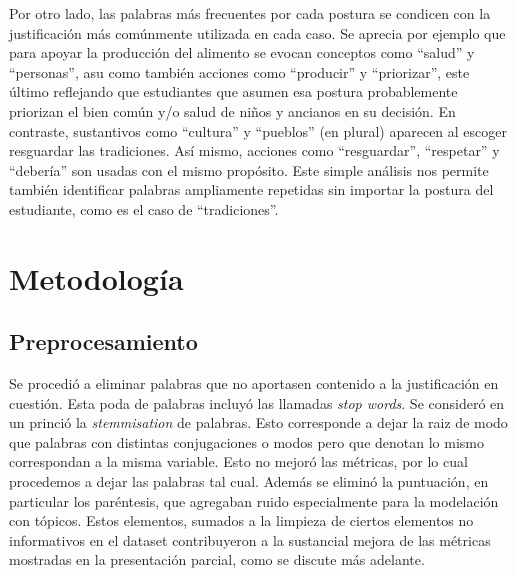 \documentclass[
	spanish, %
	letterpaper, oneside
]{article}
\begin{document}


\newp Por otro lado, las palabras más frecuentes por cada postura se condicen con la justificación más comúnmente utilizada en cada caso. Se aprecia por ejemplo que para apoyar la producción del alimento se evocan conceptos como ``salud'' y ``personas'', asu como también acciones como ``producir'' y ``priorizar'', este último reflejando que estudiantes que asumen esa postura probablemente priorizan el bien común y/o salud de niños y ancianos en su decisión. En contraste, sustantivos como ``cultura'' y ``pueblos'' (en plural) aparecen al escoger resguardar las tradiciones. Así mismo, acciones como ``resguardar'', ``respetar'' y ``debería'' son usadas con el mismo propósito. Este simple análisis nos permite también identificar palabras ampliamente repetidas sin importar la postura del estudiante, como es el caso de ``tradiciones''.




\section{Metodología}

\subsection{Preprocesamiento}

Se procedió a eliminar palabras que no aportasen contenido a la justificación en cuestión. Esta poda de palabras incluyó las llamadas \textit{stop words}. Se consideró en un princió la \textit{stemmisation} de palabras. Esto corresponde a dejar la raiz de modo que palabras con distintas conjugaciones o modos pero que denotan lo mismo correspondan a la misma variable. Esto no mejoró las métricas, por lo cual procedemos a dejar las palabras tal cual. Además se eliminó la puntuación, en particular los paréntesis, que agregaban ruido especialmente para la modelación con tópicos. Estos elementos, sumados a la limpieza de ciertos elementos no informativos en el dataset contribuyeron a la sustancial mejora de las métricas mostradas en la presentación parcial, como se discute más adelante.
\end{document}
